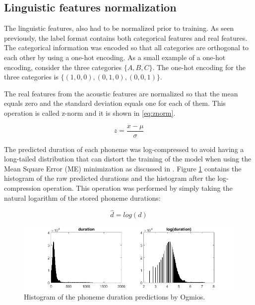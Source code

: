\subsection{Linguistic features normalization}

The linguistic features, also had to be normalized prior to training. As seen previously, the label format contains both categorical features and real features. The categorical information was encoded so that all categories are orthogonal to each other by using a one-hot encoding. As a small example of a one-hot encoding, consider the three categories $\{A, B, C\}$. The  one-hot encoding for the three categories is $\{(1,0,0), (0,1,0), (0,0,1)\}$.

The real features from the acoustic features are normalized so that the mean equals zero and the standard deviation equals one for each of them. This operation is called z-norm and it is shown in \ref{eq:znorm}.

\begin{equation}
    z = \frac{x - \mu}{\sigma}
    \label{eq:znorm}
\end{equation}

The predicted duration of each phoneme was log-compressed to avoid having a long-tailed distribution that can distort the training of the model when using the Mean Square Error (ME) minimization as discussed in \cite{pascual2006deep}. Figure \ref{fig:hist-d} contains the histogram of the raw predicted durations and the histogram after the log-compression operation. This operation was performed by simply taking the natural logarithm of the stored phoneme durations:

\begin{equation}
    \hat{d} = log(d)
\end{equation}

\begin{figure}[h]
    \centering
    \includegraphics[width=14cm]{figures/dur}
    \caption{Histogram of the phoneme duration predictions by Ogmios.}
    \label{fig:hist-d}
\end{figure}

